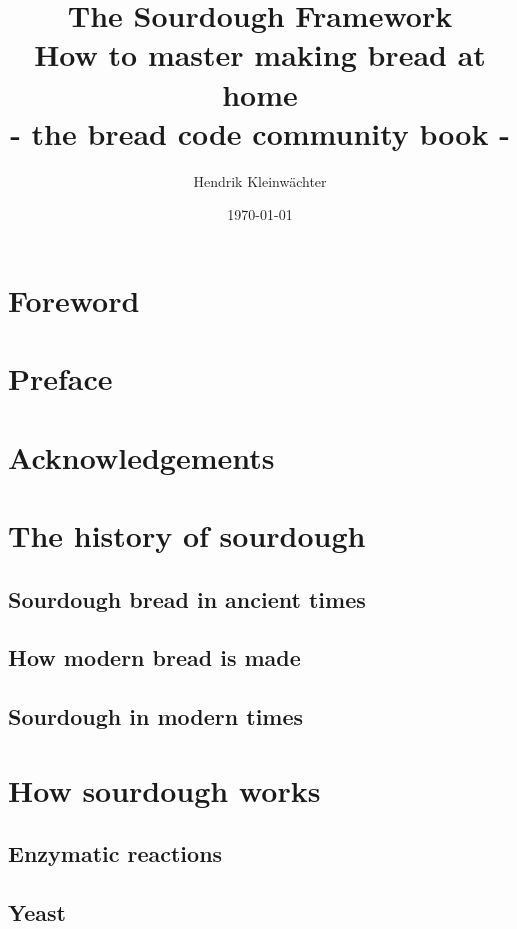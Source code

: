 \documentclass[a4paper, 12pt]{book}
\title{%
  The Sourdough Framework\\
  \large How to master making bread at home\\
  \small - the bread code community book -}
\author{Hendrik Kleinwächter}
\date{\today}
\begin{document}
\begin{titlepage}
\maketitle
\end{titlepage}


\frontmatter

\tableofcontents

\chapter{Foreword}


\chapter{Preface}


\chapter{Acknowledgements}



\mainmatter

\chapter{The history of sourdough}
\section{Sourdough bread in ancient times}
\section{How modern bread is made}
\section{Sourdough in modern times}

\chapter{How sourdough works}
\section{Enzymatic reactions}
\section{Yeast}
\end{document}
